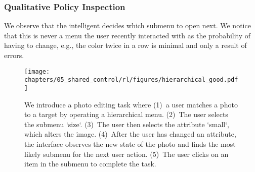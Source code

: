 \subsubsection*{Qualitative Policy Inspection} 
We observe that the \interfaceagent intelligent decides which submenu to open next. We notice that this is never a menu the user recently interacted with as the probability of having to change, e.g., the color twice in a row is minimal and only a result of errors.

\begin{figure}[!t]
    \centering
    \texttt{[image: chapters/05\_shared\_control/rl/figures/hierarchical\_good.pdf]}
    \caption{We introduce a photo editing task where (1)~a user matches a photo to a target by operating a hierarchical menu. (2)~The user selects the submenu `size`. (3)~The user then selects the attribute `small`, which alters the image. (4)~After the user has changed an attribute, the interface observes the new state of the photo and finds the most likely submenu for the next user action. (5)~The user clicks on an item in the submenu to complete the task.}
    \label{fig:hierarchical_good}
\end{figure}